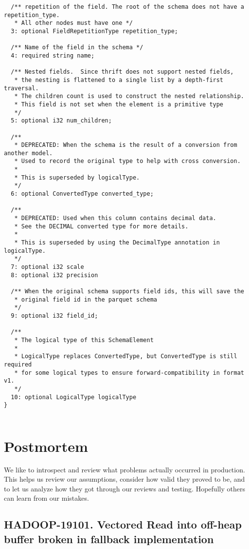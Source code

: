 \documentclass[manuscript]{acmart}
\begin{document}
\begin{verbatim}
  /** repetition of the field. The root of the schema does not have a repetition_type.
   * All other nodes must have one */
  3: optional FieldRepetitionType repetition_type;

  /** Name of the field in the schema */
  4: required string name;

  /** Nested fields.  Since thrift does not support nested fields,
   * the nesting is flattened to a single list by a depth-first traversal.
   * The children count is used to construct the nested relationship.
   * This field is not set when the element is a primitive type
   */
  5: optional i32 num_children;

  /**
   * DEPRECATED: When the schema is the result of a conversion from another model.
   * Used to record the original type to help with cross conversion.
   *
   * This is superseded by logicalType.
   */
  6: optional ConvertedType converted_type;

  /**
   * DEPRECATED: Used when this column contains decimal data.
   * See the DECIMAL converted type for more details.
   *
   * This is superseded by using the DecimalType annotation in logicalType.
   */
  7: optional i32 scale
  8: optional i32 precision

  /** When the original schema supports field ids, this will save the
   * original field id in the parquet schema
   */
  9: optional i32 field_id;

  /**
   * The logical type of this SchemaElement
   *
   * LogicalType replaces ConvertedType, but ConvertedType is still required
   * for some logical types to ensure forward-compatibility in format v1.
   */
  10: optional LogicalType logicalType
}


\end{verbatim}

\section{Postmortem}\label{sec:postmortem}
We like to introspect and review what problems actually occurred
in production.
This helps us review our assumptions, consider how valid they proved
to be, and to let us analyze how they got through our reviews and testing.
Hopefully others can learn from our mistakes.


\subsection{HADOOP-19101. Vectored Read into off-heap buffer broken in fallback implementation}
\label{subsec:hadoop-19101}
\end{document}
